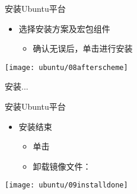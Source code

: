 \documentclass[fontset = none, t]{ctexbeamer}
\begin{document}
\begin{frame}{安装\tl}{Ubuntu平台}
  \begin{spacing}{1.0}
    \begin{itemize}
    \item 选择\tl 安装方案及宏包组件
      \begin{itemize}
      \item 确认无误后，单击进行安装
      \end{itemize}
    \end{itemize}
    \begin{center}
      \begin{annotatedFigure}
        {\texttt{[image: ubuntu/08afterscheme]}}
      \end{annotatedFigure}
    \end{center}
  \end{spacing}
\end{frame}

\begin{frame}
  安装...
\end{frame}

\begin{frame}{安装\tl}{Ubuntu平台}
  \begin{spacing}{1.5}
    \begin{itemize}
    \item 安装结束
      \begin{itemize}
      \item 单击
      \item 卸载镜像文件：
      \end{itemize}
    \end{itemize}
  \begin{center}
    \texttt{[image: ubuntu/09installdone]}
  \end{center}
  \end{spacing}
\end{frame}
\end{document}
